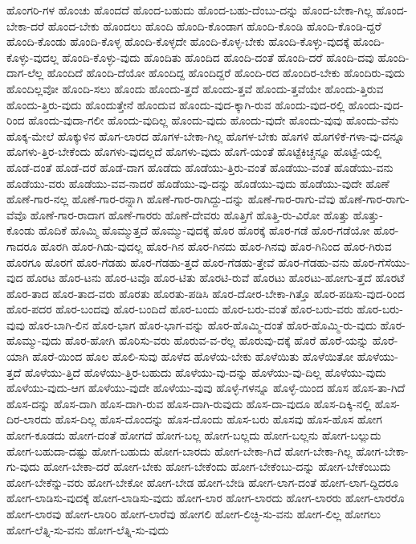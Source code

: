 {ಹೊಂಗರಿ-ಗಳ
ಹೊಂಚು
ಹೊಂದದೆ
ಹೊಂದ-ಬಹುದು
ಹೊಂದ-ಬಹು-ದೆಂಬು-ದನ್ನು
ಹೊಂದ-ಬೇಕಾ-ಗಿಲ್ಲ
ಹೊಂದ-ಬೇಕಾ-ದರೆ
ಹೊಂದ-ಬೇಕು
ಹೊಂದಲು
ಹೊಂದಿ
ಹೊಂದಿ-ಕೊಂಡಾಗ
ಹೊಂದಿ-ಕೊಂಡಿ
ಹೊಂದಿ-ಕೊಂಡಿ-ದ್ದರೆ
ಹೊಂದಿ-ಕೊಂಡು
ಹೊಂದಿ-ಕೊಳ್ಳ
ಹೊಂದಿ-ಕೊಳ್ಳದೇ
ಹೊಂದಿ-ಕೊಳ್ಳ-ಬೇಕು
ಹೊಂದಿ-ಕೊಳ್ಳು-ವುದಕ್ಕೆ
ಹೊಂದಿ-ಕೊಳ್ಳು-ವುದಲ್ಲ
ಹೊಂದಿ-ಕೊಳ್ಳು-ವುದು
ಹೊಂದಿತು
ಹೊಂದಿದ
ಹೊಂದಿ-ದಂತೆ
ಹೊಂದಿ-ದರೆ
ಹೊಂದಿ-ದವು
ಹೊಂದಿ-ದಾಗ-ಲೆಲ್ಲ
ಹೊಂದಿದೆ
ಹೊಂದಿ-ದೆಯೋ
ಹೊಂದಿದ್ದ
ಹೊಂದಿದ್ದರೆ
ಹೊಂದಿ-ರದ
ಹೊಂದಿರ-ಬೇಕು
ಹೊಂದಿರು-ವುದು
ಹೊಂದಿಲ್ಲವೋ
ಹೊಂದಿ-ಸಲು
ಹೊಂದು
ಹೊಂದು-ತ್ತದೆ
ಹೊಂದು-ತ್ತವೆ
ಹೊಂದು-ತ್ತವೆಯೇ
ಹೊಂದು-ತ್ತಿರುವ
ಹೊಂದು-ತ್ತಿರು-ವುದು
ಹೊಂದುತ್ತೇನೆ
ಹೊಂದುವ
ಹೊಂದು-ವುದ-ಕ್ಕಾಗಿ-ರುವ
ಹೊಂದು-ವುದ-ರಲ್ಲಿ
ಹೊಂದು-ವುದ-ರಿಂದ
ಹೊಂದು-ವುದಾ-ಗಲೀ
ಹೊಂದು-ವುದಿಲ್ಲ
ಹೊಂದು-ವುದು
ಹೊಂದು-ವುದೇ
ಹೊಂದು-ವುವು
ಹೊಂದು-ವೆನು
ಹೊಕ್ಕ-ಮೇಲೆ
ಹೊಕ್ಕುಳಿನ
ಹೊಗ-ಲಾರದ
ಹೊಗಳ-ಬೇಕಾ-ಗಿಲ್ಲ
ಹೊಗಳ-ಬೇಕು
ಹೊಗಳಿ
ಹೊಗಳಿಕೆ-ಗಳಾ-ವು-ದನ್ನೂ
ಹೊಗಳು-ತ್ತಿರ-ಬೇಕೆಂದು
ಹೊಗಳು-ವುದಲ್ಲದೆ
ಹೊಗಳು-ವುದು
ಹೊಗೆ-ಯಂತೆ
ಹೊಟ್ಟೆಕಿಚ್ಚನ್ನೂ
ಹೊಟ್ಟೆ-ಯಲ್ಲಿ
ಹೊಡೆ-ದಂತೆ
ಹೊಡೆ-ದರೆ
ಹೊಡೆ-ದಾಗ
ಹೊಡೆದು
ಹೊಡೆಯು-ತ್ತಿರು-ವಂತೆ
ಹೊಡೆಯು-ವಂತೆ
ಹೊಡೆಯು-ವನು
ಹೊಡೆಯು-ವರು
ಹೊಡೆಯು-ವವ-ನಾದರೆ
ಹೊಡೆಯು-ವು-ದನ್ನು
ಹೊಡೆಯು-ವುದು
ಹೊಡೆಯು-ವುದೇ
ಹೊಣೆ
ಹೊಣೆ-ಗಾರ-ನಲ್ಲ
ಹೊಣೆ-ಗಾರ-ರನ್ನಾಗಿ
ಹೊಣೆ-ಗಾರ-ರಾಗಿದ್ದು-ದನ್ನು
ಹೊಣೆ-ಗಾರ-ರಾಗು-ವೆವು
ಹೊಣೆ-ಗಾರ-ರಾಗು-ವೆವೊ
ಹೊಣೆ-ಗಾರ-ರಾದಾಗ
ಹೊಣೆ-ಗಾರರು
ಹೊಣೆ-ದೇವರು
ಹೊತ್ತಿಗೆ
ಹೊತ್ತಿ-ರು-ವಿರೋ
ಹೊತ್ತು
ಹೊತ್ತು-ಕೊಂಡು
ಹೊದಿಕೆ
ಹೊಮ್ಮಿ
ಹೊಮ್ಮುತ್ತದೆ
ಹೊಮ್ಮು-ವುದಕ್ಕೆ
ಹೊರ
ಹೊರಕ್ಕೆ
ಹೊರ-ಗಡೆ
ಹೊರ-ಗಡೆಯೋ
ಹೊರ-ಗಾದರೂ
ಹೊರಗಿ
ಹೊರ-ಗಿಡು-ವುದಲ್ಲ
ಹೊರ-ಗಿನ
ಹೊರ-ಗಿನದು
ಹೊರ-ಗಿನವು
ಹೊರ-ಗಿನಿಂದ
ಹೊರ-ಗಿರುವ
ಹೊರಗೂ
ಹೊರಗೆ
ಹೊರ-ಗೆಡಹು
ಹೊರ-ಗೆಡಹು-ತ್ತದೆ
ಹೊರ-ಗೆಡಹು-ತ್ತೇವೆ
ಹೊರ-ಗೆಡಹು-ವನು
ಹೊರ-ಗೆಸೆಯು-ವುದ
ಹೊರಟ
ಹೊರ-ಟನು
ಹೊರ-ಟವೊ
ಹೊರ-ಟಿತು
ಹೊರಟಿ-ರುವೆ
ಹೊರಟು
ಹೊರಟು-ಹೋಗು-ತ್ತದೆ
ಹೊರಟೆ
ಹೊರ-ತಾದ
ಹೊರ-ತಾದ-ವರು
ಹೊರತು
ಹೊರತು-ಪಡಿಸಿ
ಹೊರ-ದೋರ-ಬೇಕಾ-ಗಿತ್ತೊ
ಹೊರ-ಪಡಿಸು-ವುದ-ರಿಂದ
ಹೊರ-ಪದರ
ಹೊರ-ಬಂದವು
ಹೊರ-ಬಂದಿದೆ
ಹೊರ-ಬಂದು
ಹೊರ-ಬರು-ವಂತೆ
ಹೊರ-ಬರು-ವರು
ಹೊರ-ಬರು-ವುವು
ಹೊರ-ಬಾಗಿ-ಲಿನ
ಹೊರ-ಭಾಗ
ಹೊರ-ಭಾಗ-ವನ್ನು
ಹೊರ-ಹೊಮ್ಮಿ-ದಂತೆ
ಹೊರ-ಹೊಮ್ಮಿ-ರು-ವುದು
ಹೊರ-ಹೊಮ್ಮು-ವುದು
ಹೊರ-ಹೋಗಿ
ಹೊರಿಸು-ವರು
ಹೊರುವ-ವ-ರೆಲ್ಲ
ಹೊರುವು-ದಕ್ಕೆ
ಹೊರೆ
ಹೊರೆ-ಯನ್ನು
ಹೊರೆ-ಯಾಗಿ
ಹೊರೆ-ಯಿಂದ
ಹೊಲ
ಹೊಲಿ-ಸುವು
ಹೊಳೆದ
ಹೊಳೆಯ-ಬೇಕು
ಹೊಳೆಯಿತು
ಹೊಳೆಯಿತೋ
ಹೊಳೆಯು-ತ್ತದೆ
ಹೊಳೆಯು-ತ್ತಿದೆ
ಹೊಳೆಯು-ತ್ತಿರ-ಬಹುದು
ಹೊಳೆಯು-ವು-ದನ್ನು
ಹೊಳೆಯು-ವು-ದಿಲ್ಲ
ಹೊಳೆಯು-ವುದು
ಹೊಳೆಯು-ವುದು-ಆಗ
ಹೊಳೆಯು-ವುದೇ
ಹೊಳೆಯು-ವುವು
ಹೊಳ್ಳೆ-ಗಳನ್ನೂ
ಹೊಳ್ಳೆ-ಯಿಂದ
ಹೊಸ
ಹೊಸ-ತಾ-ಗಿದೆ
ಹೊಸ-ದನ್ನು
ಹೊಸ-ದಾಗಿ
ಹೊಸ-ದಾಗಿ-ರುವ
ಹೊಸ-ದಾಗಿ-ರುವುದು
ಹೊಸ-ದಾ-ವುದೂ
ಹೊಸ-ದಿಕ್ಕಿ-ನಲ್ಲಿ
ಹೊಸ-ದಿರ-ಲಾರದು
ಹೊಸ-ದಿಲ್ಲ
ಹೊಸ-ದೊಂದನ್ನು
ಹೊಸ-ದೊಂದು
ಹೊಸ-ಬರು
ಹೊಸವು
ಹೊಸ-ಹೊಸ
ಹೋಗ
ಹೋಗ-ಕೂಡದು
ಹೋಗ-ದಂತೆ
ಹೋಗದೆ
ಹೋಗ-ಬಲ್ಲ
ಹೋಗ-ಬಲ್ಲದು
ಹೋಗ-ಬಲ್ಲನು
ಹೋಗ-ಬಲ್ಲುದು
ಹೋಗ-ಬಹುದಾ-ದಷ್ಟು
ಹೋಗ-ಬಹುದು
ಹೋಗ-ಬಾರದು
ಹೋಗ-ಬೇಕಾ-ಗಿದೆ
ಹೋಗ-ಬೇಕಾ-ಗಿಲ್ಲ
ಹೋಗ-ಬೇಕಾ-ಗು-ವುದು
ಹೋಗ-ಬೇಕಾ-ದರೆ
ಹೋಗ-ಬೇಕು
ಹೋಗ-ಬೇಕೆಂದು
ಹೋಗ-ಬೇಕೆಂಬು-ದನ್ನು
ಹೋಗ-ಬೇಕೆಂಬುದು
ಹೋಗ-ಬೇಕೆನ್ನು-ವರು
ಹೋಗ-ಬೇಕೋ
ಹೋಗ-ಬೇಡ
ಹೋಗ-ಬೇಡಿ
ಹೋಗ-ಲಾಗ-ದಂತೆ
ಹೋಗ-ಲಾಗ-ದ್ದಿದರೂ
ಹೋಗ-ಲಾಡಿಸು-ವುದಕ್ಕೆ
ಹೋಗ-ಲಾಡಿಸು-ವುದು
ಹೋಗ-ಲಾರ
ಹೋಗ-ಲಾರದು
ಹೋಗ-ಲಾರರು
ಹೋಗ-ಲಾರರೊ
ಹೋಗ-ಲಾರವು
ಹೋಗ-ಲಾರಿರಿ
ಹೋಗ-ಲಾರೆವು
ಹೋಗಲಿ
ಹೋಗ-ಲಿಚ್ಛಿ-ಸು-ವನು
ಹೋಗ-ಲಿಲ್ಲ
ಹೋಗಲು
ಹೋಗ-ಲೆತ್ನಿ-ಸು-ವನು
ಹೋಗ-ಲೆತ್ನಿ-ಸು-ವುದು
}

